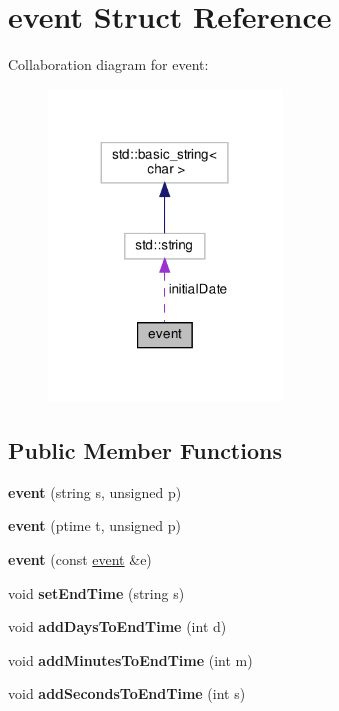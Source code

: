 \hypertarget{structevent}{}\section{event Struct Reference}
\label{structevent}


Collaboration diagram for event\+:\nopagebreak
\begin{figure}[H]
\begin{center}
\leavevmode
\includegraphics[width=176pt]{structevent__coll__graph}
\end{center}
\end{figure}
\subsection*{Public Member Functions}
\begin{DoxyCompactItemize}
\item 
\mbox{\label{structevent_a730f8d0598f47a0991bf1e4148435b2d}} 
{\bfseries event} (string s, unsigned p)
\item 
\mbox{\label{structevent_a4f61b72722376cd96b7e04218144acbf}} 
{\bfseries event} (ptime t, unsigned p)
\item 
\mbox{\label{structevent_a8db259e5b385cc72d89aec4a32696f7b}} 
{\bfseries event} (const \mbox{\hyperlink{structevent}{event}} \&e)
\item 
\mbox{\label{structevent_abbe5e998115b21515138c27e290e3110}} 
void {\bfseries set\+End\+Time} (string s)
\item 
\mbox{\label{structevent_ab21a6b2eea8829fd6d7ed60868472d1f}} 
void {\bfseries add\+Days\+To\+End\+Time} (int d)
\item 
\mbox{\label{structevent_a0cb1cccaf2a6e06ad214ce66ae06befb}} 
void {\bfseries add\+Minutes\+To\+End\+Time} (int m)
\item 
\mbox{\label{structevent_a1f28e916e6863e303f60802e951fb37f}} 
void {\bfseries add\+Seconds\+To\+End\+Time} (int s)
\end{DoxyCompactItemize}

